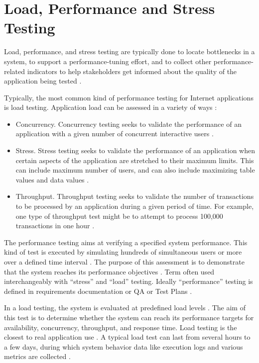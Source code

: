 \documentclass{report}
\begin{document}
\section{Load, Performance and Stress Testing}

Load, performance, and stress testing are typically done to locate bottlenecks in a system, to support a performance-tuning effort, and to collect other performance-related indicators to help stakeholders get informed about the quality of the application being tested \cite{Sandler2004} \cite{Corporation2007}.

Typically, the most common kind of performance testing for Internet applications is load testing. Application load can be assessed in a variety of ways \cite{Perry2004}:

\begin{itemize}
\item Concurrency. Concurrency testing seeks to validate the performance of an application with a given number of concurrent interactive users \cite{Perry2004}.
\item Stress. Stress testing seeks to validate the performance of an application when certain aspects of the application are stretched to their maximum limits. This can include maximum number of users, and can also include maximizing table values and data values \cite{Perry2004}.
\item Throughput. Throughput testing seeks to validate the number of transactions to be processed by an application during a given period of time. For example, one type of throughput test might be to attempt to process 100,000 transactions in one hour \cite{Perry2004}.
\end{itemize}


The performance testing aims at verifying a specified system performance. This kind of test is executed by simulating hundreds of simultaneous users or more over a defined time interval \cite{DiLucca2006}. The purpose of this assessment is to demonstrate that the system reaches its performance objectives \cite{Sandler2004}.  Term often used interchangeably with “stress” and “load” testing. Ideally “performance” testing is defined in requirements documentation or QA or Test Plans \cite{Lewis2005}.


In a load testing, the system is evaluated at predefined load levels \cite{DiLucca2006}. The aim of this test is to determine whether the system can reach its performance targets for availability, concurrency, throughput, and response time. Load testing is the closest to real application use \cite{Molyneaux2009}. A typical load test can last from several hours to a few days, during which system behavior data like execution logs and various metrics are collected \cite{Afzal2009a}.
\end{document}
